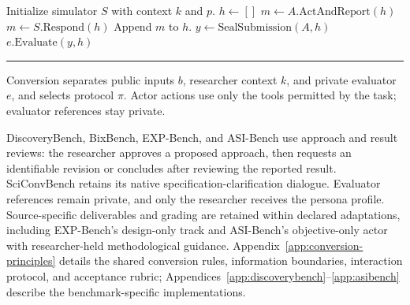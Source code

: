 \begin{minipage}{\linewidth}
\begin{minipage}[t]{0.52\linewidth}
\begin{algorithmic}[1]
      \STATE Initialize simulator $S$ with context $k$ and $p$.
      \STATE $h \gets []$ 
          \STATE $m \gets A.\mathrm{ActAndReport}(h)$
        \ELSE
          \STATE $m \gets S.\mathrm{Respond}(h)$
        \ENDIF
        \STATE Append $m$ to $h$.
      \ENDWHILE
      \STATE $y \gets \mathrm{SealSubmission}(A,h)$
      \RETURN $e.\mathrm{Evaluate}(y,h)$
    \end{algorithmic}
    \smallskip\hrule\smallskip
    \raggedright
    Conversion separates public inputs $b$, researcher context $k$, and
    private evaluator $e$, and selects protocol $\pi$. Actor actions use
    only the tools permitted by the task; evaluator references stay private.
    \par
    \label{alg:benchmark-episode}
  \end{minipage}
\end{minipage}
\par\medskip

\noindent DiscoveryBench, BixBench, EXP-Bench, and ASI-Bench use approach and
result reviews: the researcher approves a proposed approach, then requests
an identifiable revision or concludes after reviewing the reported result.
SciConvBench retains its native specification-clarification dialogue.
Evaluator references remain private, and only the researcher receives the
persona profile. Source-specific deliverables and grading are retained
within declared adaptations, including EXP-Bench's design-only track and
ASI-Bench's objective-only actor with researcher-held methodological
guidance. Appendix~\ref{app:conversion-principles} details the shared
conversion rules, information boundaries, interaction protocol, and
acceptance rubric; Appendices~\ref{app:discoverybench}--\ref{app:asibench} describe the
benchmark-specific implementations.
